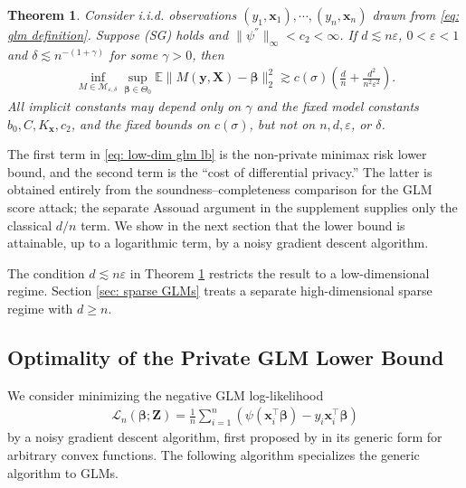 \documentclass[letterpaper,12pt]{article}
\numberwithin{equation}{section}
\theoremstyle{plain}
\newtheorem{Theorem}{Theorem}
\numberwithin{Theorem}{section}
\numberwithin{proposition}{section}
\numberwithin{Lemma}{section}
{
	\theoremstyle{definition}
	\newtheorem{Definition}{Definition}
	\newtheorem{example}{Example}
	\numberwithin{example}{section}
	\newtheorem{fact}{Fact}
	\numberwithin{fact}{section}
	\newtheorem{remark}{Remark}
}
\newcommand{\rev}[1]{#1}
\newcommand{\furtherrev}[1]{#1}
\newcommand{\1}{\mathbbm{1}}
\def\bbeta{{\boldsymbol{\beta}}}
\def\E{\mathbb{E}}
\def\L{{\mathcal L}}
\begin{document}
\begin{Theorem}\label{thm: low-dim glm lb}
		Consider i.i.d. observations $(y_1, \bm x_1), \cdots, (y_n, \bm x_n)$ drawn from \eqref{eq: glm definition}. Suppose (SG) holds and $\|\psi^{''}\|_\infty < c_2 < \infty$. If $d \lesssim n\varepsilon$, $0 < \varepsilon < 1$ and $\delta \lesssim n^{-(1+\gamma)}$ for some $\gamma > 0$, then
	\begin{align}\label{eq: low-dim glm lb}
		\rev{\inf_{M \in \mathcal M_{\varepsilon, \delta}}\sup_{\bbeta \in \Theta_0}} \E\|M(\bm y, \bm X)- \bbeta\|_2^2 \gtrsim c(\sigma) \left(\frac{d}{n} + \frac{d^2}{n^2\varepsilon^2}\right).
	\end{align}
	\furtherrev{All implicit constants may depend only on $\gamma$ and the fixed model constants $b_0,C,K_{\bm x},c_2$, and the fixed bounds on $c(\sigma)$, but not on $n,d,\varepsilon$, or $\delta$.}
\end{Theorem}
The first term in \eqref{eq: low-dim glm lb} is the non-private minimax risk lower bound, and the second term is the ``cost of differential privacy.'' \rev{The latter is obtained entirely from the soundness--completeness comparison for the GLM score attack; the separate Assouad argument in the supplement supplies only the classical $d/n$ term.} We show in the next section that the lower bound is attainable, up to a logarithmic term, by a noisy gradient descent algorithm.

The condition $d \lesssim n\varepsilon$ in Theorem \ref{thm: low-dim glm lb} restricts the result to a low-dimensional regime. Section \ref{sec: sparse GLMs} treats a separate high-dimensional sparse regime with $d\geq n$.


\subsection{Optimality of the Private GLM Lower Bound}\label{sec: non-sparse glm upper bound}
We consider minimizing the negative GLM log-likelihood
\begin{align*}
	\L_n(\bbeta; \bm Z) = \frac{1}{n}\sum_{i=1}^n \left(\psi(\bm x_i^\top \bbeta) - y_i\bm x_i^\top \bbeta\right)
\end{align*}
by a noisy gradient descent algorithm, first proposed by \cite{bassily2014private} in its generic form for arbitrary convex functions. The following algorithm specializes the generic algorithm to GLMs.
\end{document}
